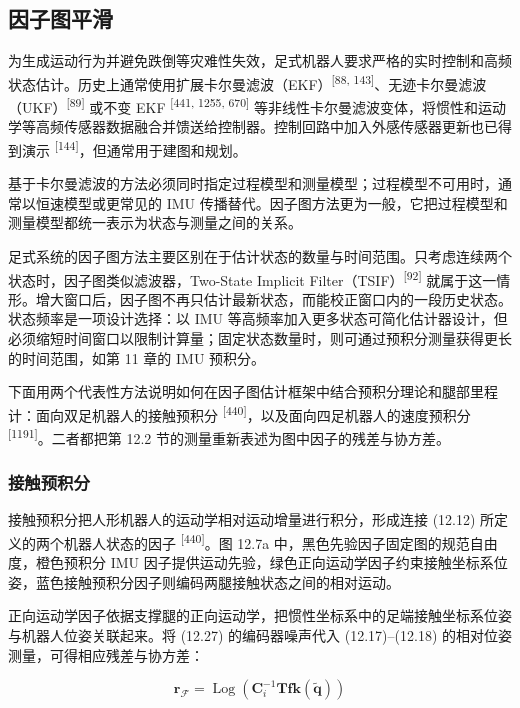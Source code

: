 \subsection{因子图平滑}

为生成运动行为并避免跌倒等灾难性失效，足式机器人要求严格的实时控制和高频状态估计。历史上通常使用扩展卡尔曼滤波（EKF）\textsuperscript{[88, 143]}、无迹卡尔曼滤波（UKF）\textsuperscript{[89]} 或不变 EKF \textsuperscript{[441, 1255, 670]} 等非线性卡尔曼滤波变体，将惯性和运动学等高频传感器数据融合并馈送给控制器。控制回路中加入外感传感器更新也已得到演示 \textsuperscript{[144]}，但通常用于建图和规划。

基于卡尔曼滤波的方法必须同时指定过程模型和测量模型；过程模型不可用时，通常以恒速模型或更常见的 IMU 传播替代。因子图方法更为一般，它把过程模型和测量模型都统一表示为状态与测量之间的关系。

足式系统的因子图方法主要区别在于估计状态的数量与时间范围。只考虑连续两个状态时，因子图类似滤波器，Two-State Implicit Filter（TSIF）\textsuperscript{[92]} 就属于这一情形。增大窗口后，因子图不再只估计最新状态，而能校正窗口内的一段历史状态。状态频率是一项设计选择：以 IMU 等高频率加入更多状态可简化估计器设计，但必须缩短时间窗口以限制计算量；固定状态数量时，则可通过预积分测量获得更长的时间范围，如第 11 章的 IMU 预积分。

下面用两个代表性方法说明如何在因子图估计框架中结合预积分理论和腿部里程计：面向双足机器人的接触预积分 \textsuperscript{[440]}，以及面向四足机器人的速度预积分 \textsuperscript{[1191]}。二者都把第 12.2 节的测量重新表述为图中因子的残差与协方差。

\subsubsection{接触预积分}

接触预积分把人形机器人的运动学相对运动增量进行积分，形成连接 (12.12) 所定义的两个机器人状态的因子 \textsuperscript{[440]}。图 12.7a 中，黑色先验因子固定图的规范自由度，橙色预积分 IMU 因子提供运动先验，绿色正向运动学因子约束接触坐标系位姿，蓝色接触预积分因子则编码两腿接触状态之间的相对运动。

正向运动学因子依据支撑腿的正向运动学，把惯性坐标系中的足端接触坐标系位姿与机器人位姿关联起来。将 (12.27) 的编码器噪声代入 (12.17)--(12.18) 的相对位姿测量，可得相应残差与协方差：

\begin{equation}
\boldsymbol {r} _ {\mathcal {F}} = \operatorname{Log} \left(\boldsymbol {C} _ {i} ^ {- 1} \boldsymbol {T} \mathbf {f k} (\tilde {\boldsymbol {q}})\right)\tag{12.29}
\end{equation}

